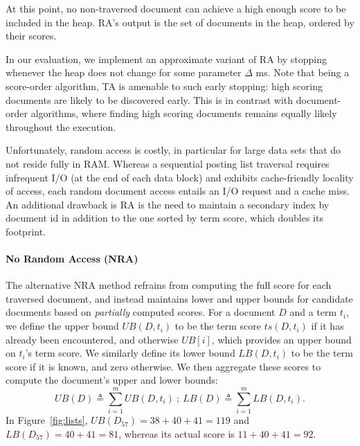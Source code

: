 At this point, no non-traversed document can achieve a high enough score to be included in the heap. RA's output is the set of documents in the heap, ordered by their scores.

In our evaluation, we implement an approximate variant of RA by stopping whenever the heap does not change for some parameter $\Delta$ ms. 
Note that being a score-order algorithm,  TA is amenable to such early stopping: high scoring documents are likely to be discovered early.
This is in contrast with document-order algorithms, where finding high scoring documents remains equally likely throughout the execution.

Unfortunately, random access is costly,  in particular for large data sets that do not reside fully in RAM.
Whereas a sequential posting list traversal requires infrequent I/O (at the end of each data block) and exhibits cache-friendly locality of access,  each random document access entails an I/O request and a cache miss.  
An additional drawback is RA is the need to maintain a secondary index by document id in addition to the one sorted by term score, which doubles its footprint. 

\paragraph{No Random Access (NRA)} 
The alternative NRA method %
refrains from computing the full score for each traversed document, and instead
maintains lower and upper bounds for candidate documents based on {\em partially\/} computed scores. 
For a document $D$ and a term $t_i$, we define the upper bound $UB(D, t_i)$ to be the term score $ts(D, t_i)$ if it has already been encountered, and otherwise $UB[i]$, which provides an upper bound on $t_i$'s term score. We similarly define its lower bound $LB(D, t_i)$ to be the term score if it is known, and zero otherwise. We then aggregate these scores to compute the document's upper and lower bounds:
\[
UB(D) \triangleq \sum_{i=1}^m UB(D, t_i) \ ; \  
LB(D) \triangleq \sum_{i=1}^m LB(D, t_i).
\] 
In Figure~\ref{fig:lists}, $UB(D_{57}) = 38+40+41 = 119$ and $LB(D_{57}) = 40+41 = 81$, whereas its actual score  is $11+ 40+41 = 92$.

